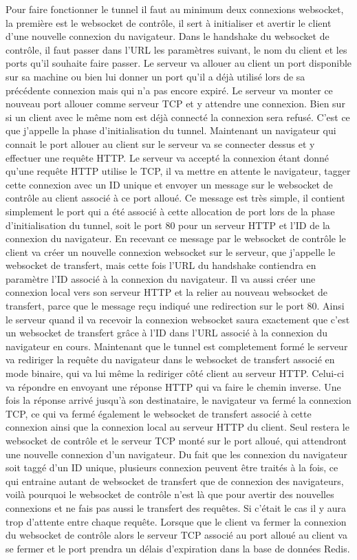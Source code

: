 Pour faire fonctionner le tunnel il faut au minimum deux connexions websocket, la première est le websocket de contrôle, il sert à initialiser et avertir le client d'une nouvelle connexion du navigateur. Dans le handshake du websocket de contrôle, il faut passer dans l'URL les paramètres suivant, le nom du client et les ports qu'il souhaite faire passer. Le serveur va allouer au client un port disponible sur sa machine ou bien lui donner un port qu'il a déjà utilisé lors de sa précédente connexion mais qui n'a pas encore expiré. Le serveur va monter ce nouveau port allouer comme serveur TCP et y attendre une connexion. Bien sur si un client avec le même nom est déjà connecté la connexion sera refusé. C'est ce que j'appelle la phase d'initialisation du tunnel. Maintenant un navigateur qui connait le port allouer au client sur le serveur va se connecter dessus et y effectuer une requête HTTP. Le serveur va accepté la connexion étant donné qu'une requête HTTP utilise le TCP, il va mettre en attente le navigateur, tagger cette connexion avec un ID unique et envoyer un message sur le websocket de contrôle au client associé à ce port alloué. Ce message est très simple, il contient simplement le port qui a été associé à cette allocation de port lors de la phase d'initialisation du tunnel, soit le port 80 pour un serveur HTTP et l'ID de la connexion du navigateur. En recevant ce message par le websocket de contrôle le client va créer un nouvelle connexion websocket sur le serveur, que j'appelle le websocket de transfert, mais cette fois l'URL du handshake contiendra en paramètre l'ID associé à la connexion du navigateur. Il va aussi créer une connexion local vers son serveur HTTP et la relier au nouveau websocket de transfert, parce que le message reçu indiqué une redirection sur le port 80. Ainsi le serveur quand il va recevoir la connexion websocket saura exactement que c'est un websocket de transfert grâce à l'ID dans l'URL associé à la connexion du navigateur en cours. Maintenant que le tunnel est completement formé le serveur va rediriger la requête du navigateur dans le websocket de transfert associé en mode binaire, qui va lui même la rediriger côté client au serveur HTTP. Celui-ci va répondre en envoyant une réponse HTTP qui va faire le chemin inverse. Une fois la réponse arrivé jusqu'à son destinataire, le navigateur va fermé la connexion TCP, ce qui va fermé également le websocket de transfert associé à cette connexion ainsi que la connexion local au serveur HTTP du client. Seul restera le websocket de contrôle et le serveur TCP monté sur le port alloué, qui attendront une nouvelle connexion d'un navigateur. Du fait que les connexion du navigateur soit taggé d'un ID unique, plusieurs connexion peuvent être traités à la fois, ce qui entraine autant de websocket de transfert que de connexion des navigateurs, voilà pourquoi le websocket de contrôle n'est là que pour avertir des nouvelles connexions et ne fais pas aussi le transfert des requêtes. Si c'était le cas il y aura trop d'attente entre chaque requête. Lorsque que le client va fermer la connexion du websocket de contrôle alors le serveur TCP associé au port alloué au client va se fermer et le port prendra un délais d'expiration dans la base de données Redis.

